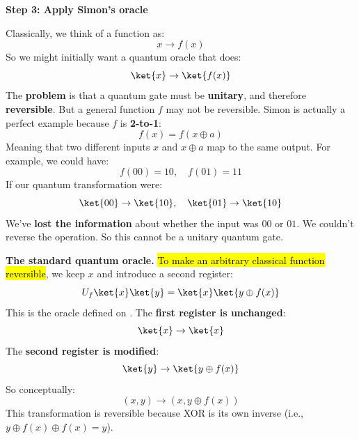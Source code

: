 \highspace
\begin{flushleft}
    \textcolor{Green3}{ \textbf{Step 3: Apply Simon's oracle}}
\end{flushleft}
Classically, we think of a function as:
\begin{equation*}
    x \to f(x)
\end{equation*}
So we might initially want a quantum oracle that does:
\begin{equation*}
    \ket{x} \to \ket{f(x)}
\end{equation*}
The \textbf{problem} is that a quantum gate must be \textbf{unitary}, and therefore \textbf{reversible}. But a general function $f$ may not be reversible. Simon is actually a perfect example because $f$ is \textbf{2-to-1}:
\begin{equation*}
    f(x) = f(x \oplus a)
\end{equation*}
Meaning that two different inputs $x$ and $x \oplus a$ map to the same output. For example, we could have:
\begin{equation*}
    f(00) = 10, \quad f(01) = 11
\end{equation*}
If our quantum transformation were:
\begin{equation*}
    \ket{00} \to \ket{10}, \quad \ket{01} \to \ket{10}
\end{equation*}
We've \textbf{lost the information} about whether the input was $00$ or $01$. We couldn't reverse the operation. So this cannot be a unitary quantum gate.

\highspace
\textcolor{Green3}{ \textbf{The standard quantum oracle.}} \hl{To make an arbitrary classical function reversible}, we keep $x$ and introduce a second register:
\begin{equation*}
    U_f\ket{x}\ket{y}
    =
    \ket{x}\ket{y\oplus f(x)}
\end{equation*}
This is the oracle defined on . The \textbf{first register is unchanged}:
\begin{equation*}
    \ket{x}\rightarrow\ket{x}
\end{equation*}
The \textbf{second register is modified}:
\begin{equation*}
    \ket{y}\rightarrow\ket{y\oplus f(x)}
\end{equation*}
So conceptually:
\begin{equation*}
    (x,y)
    \longrightarrow
    (x,y\oplus f(x))
\end{equation*}
This transformation is reversible because XOR is its own inverse (i.e., $y \oplus f(x) \oplus f(x) = y$).

